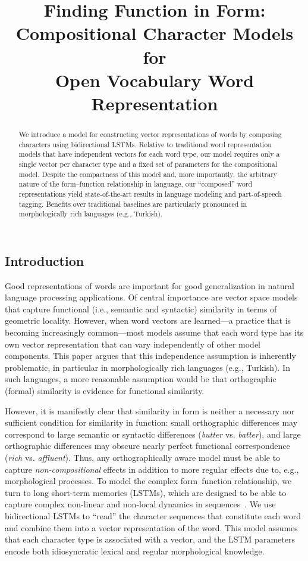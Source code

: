 \documentclass[11pt]{article}
\title{Finding Function in Form: Compositional Character Models for\\ Open Vocabulary Word Representation}
{\author{Wang Ling ~~~ Tiago Lu\'{\i}s ~~~ Lu\'{\i}s Marujo ~~~ Ram\'on Fernandez Astudillo\\ \textbf{Silvio Amir ~~~ Chris Dyer ~~~ Alan W Black ~~~ Isabel Trancoso} \\\\
  L$^2$F Spoken Systems Lab, INESC-ID, Lisbon, Portugal\\
  Language Technologies Institute, Carnegie Mellon University, Pittsburgh, PA, USA\\
  Instituto Superior T\'{e}cnico, Lisbon, Portugal\\
{\tt \{lingwang,lmarujo,cdyer,awb\}@cs.cmu.edu} \\ \tt \{ramon.astudillo,samir,tmcl,isabel.trancoso\}@inesc-id.pt\\}
}
\date{}
\begin{document}
\maketitle
\begin{CJK*}{UTF8}{gbsn}
\begin{abstract}

We introduce a model for constructing vector representations of words by composing characters using bidirectional LSTMs. Relative to traditional word representation models that have independent vectors for each word type, our model requires only a single vector per character type and a fixed set of parameters for the compositional model. Despite the compactness of this model and, more importantly, the arbitrary nature of the form--function relationship in language, our ``composed'' word representations yield state-of-the-art results in language modeling and part-of-speech tagging. Benefits over traditional baselines are particularly pronounced in morphologically rich languages (e.g., Turkish).
\end{abstract}

\section{Introduction}
Good representations of words are important for good generalization in natural language processing applications. Of central importance are vector space models that capture functional (i.e., semantic and syntactic) similarity in terms of geometric locality. However, when word vectors are learned---a practice that is becoming increasingly common---most models assume that each word type has its own vector representation that can vary independently of other model components. This paper argues that this independence assumption is inherently problematic, in particular in morphologically rich languages (e.g., Turkish). In such languages, a more reasonable assumption would be that orthographic (formal) similarity is evidence for functional similarity.

However, it is manifestly clear that similarity in form is neither a necessary nor sufficient condition for similarity in function: small orthographic differences may correspond to large semantic or syntactic differences (\emph{butter} vs. \emph{batter}), and large orthographic differences may obscure nearly perfect functional correspondence (\emph{rich} vs. \emph{affluent}).  Thus, any orthographically aware model must be able to capture \emph{non-compositional} effects in addition to more regular effects due to, e.g., morphological processes. To model the complex form--function relationship, we turn to long short-term memories (LSTMs), which are designed to be able to capture complex non-linear and non-local dynamics in sequences~\cite{Hochreiter:1997:LSM:1246443.1246450}. We use bidirectional LSTMs to ``read'' the character sequences that constitute each word and combine them into a vector representation of the word. This model assumes that each character type is associated with a vector, and the LSTM parameters encode both idiosyncratic lexical and regular morphological knowledge.


\end{CJK*}
\end{document}
